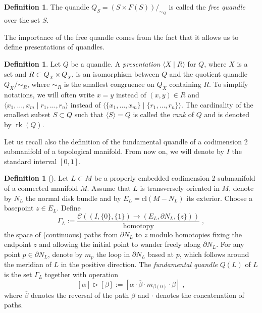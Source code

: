 \documentclass[a4paper,12pt]{amsart}
\numberwithin{equation}{section}
\theoremstyle{plain}
\theoremstyle{definition}
\newtheorem{definition}[theorem]{Definition}
\newcommand{\tr}{\triangleright}
\DeclareMathOperator{\rk}{rk}
\begin{document}
\begin{definition}
	The quandle $Q_{S}=(S\times F(S))/_{\sim _{Q}}$ is called the \textit{free quandle} over the set $S$.
\end{definition}


The importance of the free quandle comes from the fact that it allows us to define presentations of quandles.


\begin{definition}
	Let $Q$ be a quandle. A \textit{presentation} $\langle X\mid R\rangle$ for $Q$, where $X$ is a set and $R \subset Q_X \times Q_X$,
	is an isomorphism between $Q$ and the quotient quandle $Q_X/{\sim_R}$, where $\sim_R$ is the smallest congruence on $Q_X$ containing $R$. 
	To simplify notations, we will often write $x=y$ instead of $(x,y) \in R$ and $\langle x_1,\ldots, x_m  \mid r_1,\ldots, r_n\rangle$  instead of $\langle \{x_1,\ldots, x_m\}\mid \{r_1,\ldots, r_n\}\rangle$.
	The cardinality of the smallest subset $S \subset Q$ such that $\langle S \rangle = Q$ is called the \textit{rank} of $Q$ and is denoted by $\rk(Q)$.
\end{definition}


Let us recall also the definition of the fundamental quandle of a codimension 2 submanifold of a topological manifold.
From now on, we will denote by $I$ the standard interval $[0,1]$.


\begin{definition}[\cite{FR}]
	Let $L\subset M$ be a properly embedded codimension 2 subma\-ni\-fold of a connected manifold $M$.
	Assume that $L$ is transversely oriented in $M$, denote by $N_{L}$ the normal disk bundle and by $E_{L}=\text{cl}(M-N_{L})$ its exterior. 
	Choose a basepoint $z\in E_L$.
	Define
	$$\Gamma_L := \frac{\mathcal{C}( (I, \{0\}, \{1\}) \to (E_L, \partial N_L, \{z\}))}{\text{homotopy}}\; ,$$
	the space of (continuous) paths from $\partial N_L$ to $z$ modulo homotopies fixing the endpoint $z$ and allowing the initial point to wander freely along $\partial N_L$.
	For any point $p\in \partial N_{L}$, denote by $m_{p}$ the loop in $\partial N_{L}$ based at $p$, which follows around the meridian of $L$ in the positive direction.
	The \textit{fundamental quandle} $Q(L)$ of $L$ is the set $\Gamma _{L}$ together with operation
	$$[\alpha]\tr [\beta] := [\alpha \cdot \overline{\beta }\cdot m_{\beta (0)}\cdot \beta ] \;,$$
	where $\overline{\beta}$ denotes the reversal of the path $\beta$ and $\cdot $ denotes the concatenation of paths.
\end{definition}
\end{document}
